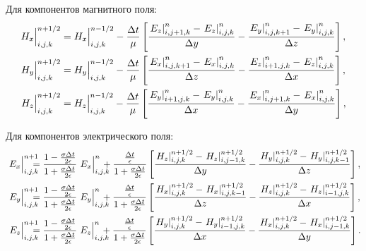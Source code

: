 Для компонентов магнитного поля:
\label{eq:BaseFdtdEquations}
\begin{align*}
	H_x\Big|^{n+1/2}_{i,j,k} &=
        H_x\Big|^{n-1/2}_{i,j,k} - \frac{\Delta{t}}{\mu}
        \left[
            \frac{\left.E_z\right|^{n}_{i,j+1,k} - \left.E_z\right|^{n}_{i,j,k}}{\Delta{y}} -
            \frac{\left.E_y\right|^{n}_{i,j,k+1} - \left.E_y\right|^{n}_{i,j,k}}{\Delta{z}}
        \right], \\
	H_y\Big|^{n+1/2}_{i,j,k} &=
        H_y\Big|^{n-1/2}_{i,j,k} - \frac{\Delta{t}}{\mu}
        \left[
            \frac{\left.E_x\right|^{n}_{i,j,k+1} - \left.E_x\right|^{n}_{i,j,k}}{\Delta{z}} -
            \frac{\left.E_z\right|^{n}_{i+1,j,k} - \left.E_z\right|^{n}_{i,j,k}}{\Delta{x}}
        \right], \\
	H_z\Big|^{n+1/2}_{i,j,k} &=
        H_z\Big|^{n-1/2}_{i,j,k} - \frac{\Delta{t}}{\mu}
        \left[
            \frac{\left.E_y\right|^{n}_{i+1,j,k} - \left.E_y\right|^{n}_{i,j,k}}{\Delta{x}} -
            \frac{\left.E_x\right|^{n}_{i,j+1,k} - \left.E_x\right|^{n}_{i,j,k}}{\Delta{y}}
        \right],
\end{align*}

Для компонентов электрического поля:
\begin{align*}
	\fYee{E_x}{n+1}{i,j,k} &=
        \frac{1-\frac{\sigma\Delta{t}}{2\epsilon}}
             {1+\frac{\sigma\Delta{t}}{2\epsilon}} \fYee{E_x}{n}{i,j,k} +
        \frac{\frac{\Delta{t}}{\epsilon}}
             {1+\frac{\sigma\Delta{t}}{2\epsilon}}
        \left[
            \frac{\yee{H_z}{n+1/2}{i,j,k} - \yee{H_z}{n+1/2}{i,j-1,k}}{\Delta{y}} -
            \frac{\yee{H_y}{n+1/2}{i,j,k} - \yee{H_y}{n+1/2}{i,j,k-1}}{\Delta{z}}
        \right], \\
	\fYee{E_y}{n+1}{i,j,k} &=
        \frac{1-\frac{\sigma\Delta{t}}{2\epsilon}}
	         {1+\frac{\sigma\Delta{t}}{2\epsilon}} \fYee{E_y}{n}{i,j,k} +
        \frac{\frac{\Delta{t}}{\epsilon}}
             {1+\frac{\sigma\Delta{t}}{2\epsilon}}
        \left[
            \frac{\yee{H_x}{n+1/2}{i,j,k} - \yee{H_x}{n+1/2}{i,j,k-1}}{\Delta{z}} -
            \frac{\yee{H_z}{n+1/2}{i,j,k} - \yee{H_z}{n+1/2}{i-1,j,k}}{\Delta{x}}
        \right], \\
	\fYee{E_z}{n+1}{i,j,k} &=
        \frac{1-\frac{\sigma\Delta{t}}{2\epsilon}}
             {1+\frac{\sigma\Delta{t}}{2\epsilon}} \fYee{E_z}{n}{i,j,k} +
        \frac{\frac{\Delta{t}}{\epsilon}}
             {1+\frac{\sigma\Delta{t}}{2\epsilon}}
        \left[
            \frac{\yee{H_y}{n+1/2}{i,j,k} - \yee{H_y}{n+1/2}{i-1,j,k}}{\Delta{x}} -
            \frac{\yee{H_x}{n+1/2}{i,j,k} - \yee{H_x}{n+1/2}{i,j-1,k}}{\Delta{y}}
        \right].
\end{align*}


